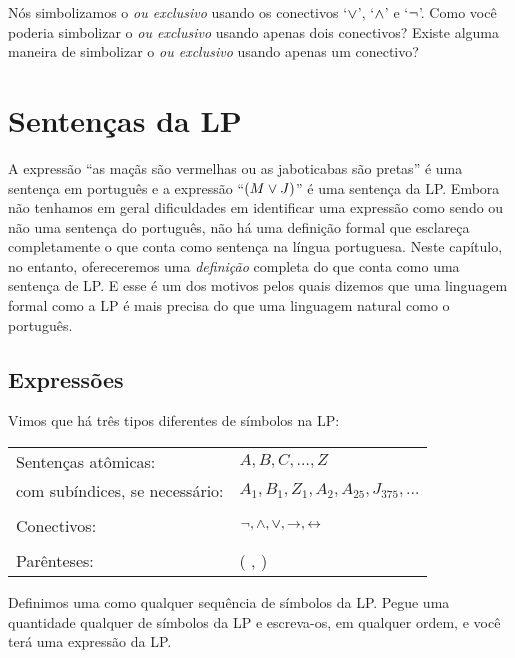 \begin{earg}


\end{earg}

\problempart
Nós simbolizamos o \emph{ou exclusivo} usando os conectivos `$\vee$', `$\wedge$' e `$\neg$'.
Como você poderia simbolizar o \emph{ou exclusivo} usando apenas dois conectivos?
Existe alguma maneira de simbolizar o \emph{ou exclusivo} usando apenas um conectivo?


\chapter{Sentenças da LP}\label{s:TFLSentences}
A expressão ``as maçãs são vermelhas ou as jaboticabas são pretas'' é uma sentença em português e a expressão ``$(M \vee J)$'' é uma sentença da LP.
Embora não tenhamos em geral dificuldades em identificar uma expressão como sendo ou não uma sentença do português, não há uma definição formal que esclareça completamente o que conta como sentença na língua portuguesa.
Neste capítulo, no entanto, ofereceremos uma \emph{definição} completa do que conta como uma sentença de LP.
E esse é um dos motivos pelos quais dizemos que uma linguagem formal como a LP é mais precisa do que uma linguagem natural como o português.


\section{Expressões}

Vimos que há três tipos diferentes de símbolos na LP:
\begin{center}
\begin{tabular}{l l}
Sentenças atômicas: & $A,B,C,\ldots,Z$\\
com subíndices, se necessário: & $A_1, B_1,Z_1,A_2,A_{25},J_{375},\ldots$\\
\\
Conectivos: & $\neg,\wedge,\vee,\rightarrow,\leftrightarrow$\\
\\
Parênteses: &( , )\\
\end{tabular}
\end{center}
Definimos uma  como qualquer sequência de símbolos da LP.
Pegue uma quantidade qualquer de símbolos da LP e escreva-os, em qualquer ordem, e você terá uma expressão da LP.


